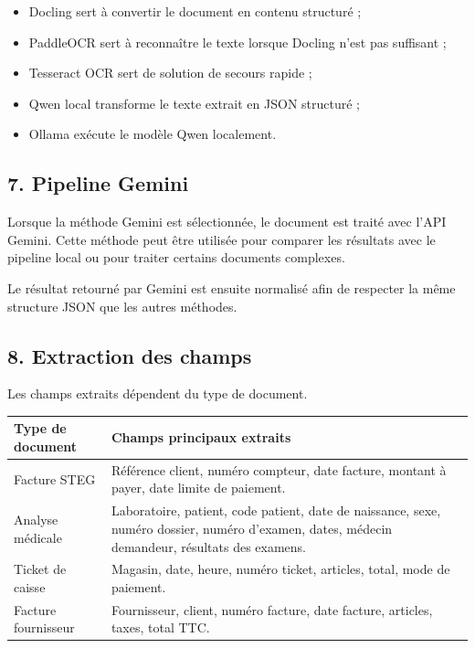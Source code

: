 \documentclass[12pt,a4paper]{report}
\begin{document}
\begin{itemize}
    \item Docling sert à convertir le document en contenu structuré ;
    \item PaddleOCR sert à reconnaître le texte lorsque Docling n'est pas suffisant ;
    \item Tesseract OCR sert de solution de secours rapide ;
    \item Qwen local transforme le texte extrait en JSON structuré ;
    \item Ollama exécute le modèle Qwen localement.
\end{itemize}

\subsection*{7. Pipeline Gemini}

Lorsque la méthode Gemini est sélectionnée, le document est traité avec l'API Gemini. Cette méthode peut être utilisée pour comparer les résultats avec le pipeline local ou pour traiter certains documents complexes.

Le résultat retourné par Gemini est ensuite normalisé afin de respecter la même structure JSON que les autres méthodes.

\subsection*{8. Extraction des champs}

Les champs extraits dépendent du type de document.

\begin{longtable}{|p{4cm}|p{10cm}|}
\hline
\textbf{Type de document} & \textbf{Champs principaux extraits} \\
\hline
Facture STEG & Référence client, numéro compteur, date facture, montant à payer, date limite de paiement. \\
\hline
Analyse médicale & Laboratoire, patient, code patient, date de naissance, sexe, numéro dossier, numéro d'examen, dates, médecin demandeur, résultats des examens. \\
\hline
Ticket de caisse & Magasin, date, heure, numéro ticket, articles, total, mode de paiement. \\
\hline
Facture fournisseur & Fournisseur, client, numéro facture, date facture, articles, taxes, total TTC. \\
\hline
\end{longtable}
\end{document}
